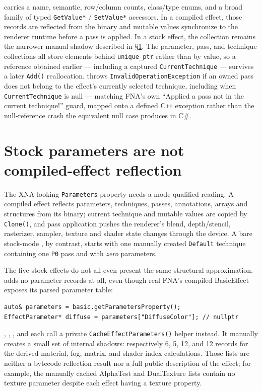  carries a name, semantic, row/column counts, class/type enums, and a
broad family of typed \texttt{GetValue*} / \texttt{SetValue*} accessors. In a compiled effect,
those records are reflected from the binary and mutable values synchronize to the renderer
runtime before a pass is applied. In a stock effect, the collection remains the narrower manual
shadow described in \S\ref{sec:stock-effect-parameter-boundary}. The
parameter, pass, and technique collections all store elements behind \texttt{unique\_ptr} rather
than by value, so a reference obtained earlier --- including a captured \texttt{CurrentTechnique}
--- survives a later \texttt{Add()} reallocation.  throws
\texttt{InvalidOperationException} if an owned pass does not belong to the effect's currently
selected technique, including when \texttt{CurrentTechnique} is null --- matching FNA's own
``Applied a pass not in the current technique!'' guard, mapped onto a defined C\texttt{++}
exception rather than the null-reference crash the equivalent null case produces in C\#.

\section{Stock parameters are not compiled-effect reflection}
\label{sec:stock-effect-parameter-boundary}

The XNA-looking \texttt{Parameters} property needs a mode-qualified reading. A compiled effect
reflects parameters, techniques, passes, annotations, arrays and structures from its binary;
current technique and mutable values are copied by \texttt{Clone()}, and pass application pushes
the renderer's blend, depth/stencil, rasterizer, sampler, texture and shader state changes through
the device. A bare stock-mode , by contrast, starts with one manually created
\texttt{Default} technique containing one \texttt{P0} pass and with \emph{zero} parameters.

The five stock effects do not all even present the same structural approximation.
 adds no parameter records at all, even though real FNA's compiled
BasicEffect exposes its parsed parameter table:

\begin{lstlisting}
auto& parameters = basic.getParametersProperty();
EffectParameter* diffuse = parameters["DiffuseColor"]; // nullptr
\end{lstlisting}

,
, , and 
each call a private \texttt{CacheEffectParameters()} helper instead. It manually creates a
small set of internal shadows: respectively 6, 5, 12, and 12 records for the derived material,
fog, matrix, and shader-index calculations. Those lists are neither a bytecode reflection result
nor a full public description of the effect; for example, the manually cached AlphaTest and
DualTexture lists contain no texture parameter despite each effect having a texture property.

